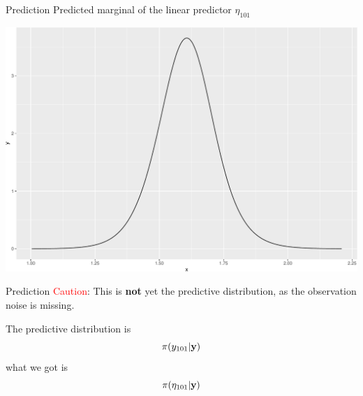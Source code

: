 \documentclass[
  ignorenonframetext,
]{beamer}
\newenvironment{Shaded}{\begin{snugshade}}{\end{snugshade}}
\newcommand{\AttributeTok}[1]{\textcolor[rgb]{0.77,0.63,0.00}{#1}}
\newcommand{\DecValTok}[1]{\textcolor[rgb]{0.00,0.00,0.81}{#1}}
\newcommand{\FunctionTok}[1]{\textcolor[rgb]{0.00,0.00,0.00}{#1}}
\newcommand{\NormalTok}[1]{#1}
\newcommand{\OtherTok}[1]{\textcolor[rgb]{0.56,0.35,0.01}{#1}}
\newcommand{\SpecialCharTok}[1]{\textcolor[rgb]{0.00,0.00,0.00}{#1}}
\begin{document}
\begin{frame}[fragile]{Prediction}
\protect\hypertarget{prediction-2}{}
Predicted marginal of the linear predictor \(\eta_{101}\)

\begin{Shaded}
\end{Shaded}

\begin{center}\includegraphics[width=0.6\linewidth]{Part3_RINLA_files/figure-beamer/unnamed-chunk-35-1} \end{center}
\end{frame}

\begin{frame}{Prediction}
\protect\hypertarget{prediction-3}{}
\textcolor{red}{Caution}: This is \textbf{not} yet the predictive
distribution, as the observation noise is missing.

The predictive distribution is \[
\pi(y_{101}|\bf{y})
\] what we got is \[
\pi(\eta_{101}|\bf{y})
\]
\end{frame}
\end{document}
